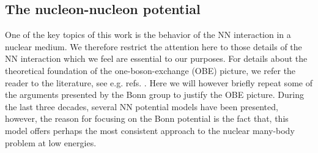 \subsection{The nucleon-nucleon potential}\label{subsec:sec312}

One of the key topics of this work
is the behavior of the NN interaction in a nuclear medium. We therefore
restrict the attention here to those details of the NN interaction which
we feel are essential to our purposes. For details about the theoretical
foundation of the one-boson-exchange (OBE) picture, we refer the reader to the
literature, see e.g. refs. \cite{erk74,bj76,mac93}. Here we will however
briefly repeat some of the arguments presented by the Bonn group
\cite{mhe87,mac89} to justify
the OBE picture. 
During the last three decades, several NN potential models have been presented,
however, the reason for focusing on the Bonn potential is the
fact that, this model offers perhaps the most consistent
approach to the nuclear many-body problem at low energies.

